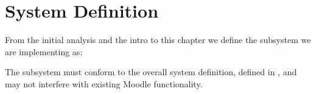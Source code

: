 \section{System Definition}
\label{sec:subSysDef}
From the initial analysis and the intro to this chapter we define the subsystem we are implementing as: 
\begin{center}
\end{center}
The subsystem must conform to the overall system definition, defined in , and may not interfere with existing Moodle functionality.